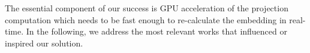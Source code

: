 




The essential component of our success is GPU acceleration of the projection computation which needs to be fast enough to re-calculate the embedding in real-time. 
In the following, we address the most relevant works that influenced or inspired our solution.

